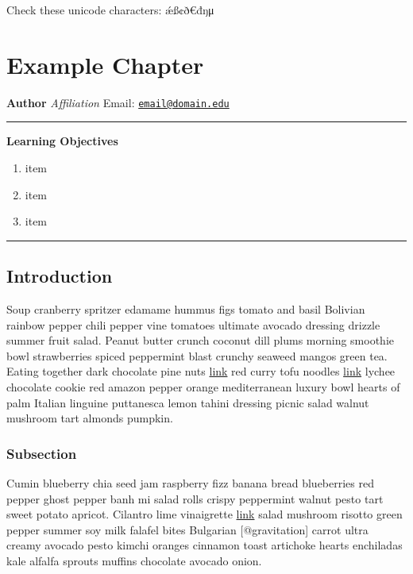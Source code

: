 \documentclass[
  11pt,
,
onecolumn,
openany
]{book}
\providecommand{\tightlist}{%
  \setlength{\itemsep}{0pt}\setlength{\parskip}{0pt}}
\begin{document}
Check these unicode characters: ǽß¢ð€đŋμ

\hypertarget{example-chapter}{%
\chapter{Example Chapter}\label{example-chapter}}

\textbf{Author} \emph{Affiliation} Email:
\href{mailto:email@domain.edu}{\nolinkurl{email@domain.edu}}

\begin{center}\rule{0.5\linewidth}{0.5pt}\end{center}

\textbf{Learning Objectives}

\begin{enumerate}
\def\labelenumi{\arabic{enumi}.}
\tightlist
\item
  item
\item
  item
\item
  item
\end{enumerate}

\begin{center}\rule{0.5\linewidth}{0.5pt}\end{center}

\hypertarget{introduction-1}{%
\section{Introduction}\label{introduction-1}}

Soup cranberry spritzer edamame hummus figs tomato and basil Bolivian rainbow
pepper chili pepper vine tomatoes ultimate avocado dressing drizzle summer
fruit salad. Peanut butter crunch coconut dill plums morning smoothie bowl
strawberries spiced peppermint blast crunchy seaweed mangos green tea. Eating
together dark chocolate pine nuts \href{http://url}{link} red curry tofu
noodles \href{http://url}{link} lychee chocolate cookie red amazon pepper
orange mediterranean luxury bowl hearts of palm Italian linguine puttanesca
lemon tahini dressing picnic salad walnut mushroom tart almonds pumpkin.

\hypertarget{subsection}{%
\subsection{Subsection}\label{subsection}}

Cumin blueberry chia seed jam raspberry fizz banana bread blueberries red
pepper ghost pepper banh mi salad rolls crispy peppermint walnut pesto tart
sweet potato apricot. Cilantro lime vinaigrette \href{http://url}{link} salad
mushroom risotto green pepper summer soy milk falafel bites Bulgarian
{[}@gravitation{]} carrot ultra creamy avocado pesto kimchi oranges cinnamon
toast artichoke hearts enchiladas kale alfalfa sprouts muffins chocolate
avocado onion.
\end{document}
